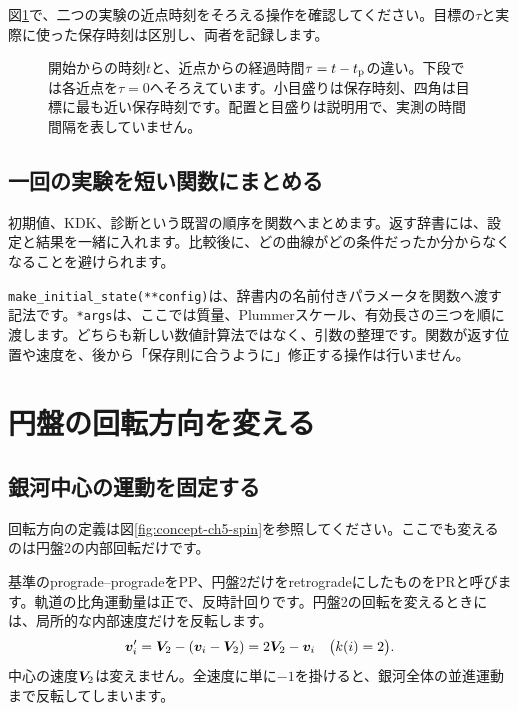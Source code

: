 図\ref{fig:concept-ch6-time}で、二つの実験の近点時刻をそろえる操作を確認してください。目標の$\tau$と実際に使った保存時刻は区別し、両者を記録します。
\begin{figure}[!htbp]
\centering

\caption{開始からの時刻$t$と、近点からの経過時間$\tau=t-t_{\rm p}$の違い。下段では各近点を$\tau=0$へそろえています。小目盛りは保存時刻、四角は目標に最も近い保存時刻です。配置と目盛りは説明用で、実測の時間間隔を表していません。}
\label{fig:concept-ch6-time}
\end{figure}
\FloatBarrier

\subsection{一回の実験を短い関数にまとめる}
初期値、KDK、診断という既習の順序を関数へまとめます。返す辞書には、設定と結果を一緒に入れます。比較後に、どの曲線がどの条件だったか分からなくなることを避けられます。

\texttt{make\_initial\_state(**config)}は、辞書内の名前付きパラメータを関数へ渡す記法です。\texttt{*args}は、ここでは質量、Plummerスケール、有効長さの三つを順に渡します。どちらも新しい数値計算法ではなく、引数の整理です。関数が返す位置や速度を、後から「保存則に合うように」修正する操作は行いません。

\section{円盤の回転方向を変える}
\label{sec:ch6-spin}
\subsection{銀河中心の運動を固定する}
回転方向の定義は図\ref{fig:concept-ch5-spin}を参照してください。ここでも変えるのは円盤2の内部回転だけです。

基準のprograde--progradeをPP、円盤2だけをretrogradeにしたものをPRと呼びます。軌道の比角運動量は正で、反時計回りです。円盤2の回転を変えるときには、局所的な内部速度だけを反転します。
\begin{equation}
 \boldsymbol v_i'=\boldsymbol V_2-(\boldsymbol v_i-\boldsymbol V_2)=2\boldsymbol V_2-\boldsymbol v_i
 \quad\bigl(k(i)=2\bigr).
 \label{eq:ch6-reverse-spin}
\end{equation}
中心の速度$\boldsymbol V_2$は変えません。全速度に単に$-1$を掛けると、銀河全体の並進運動まで反転してしまいます。

